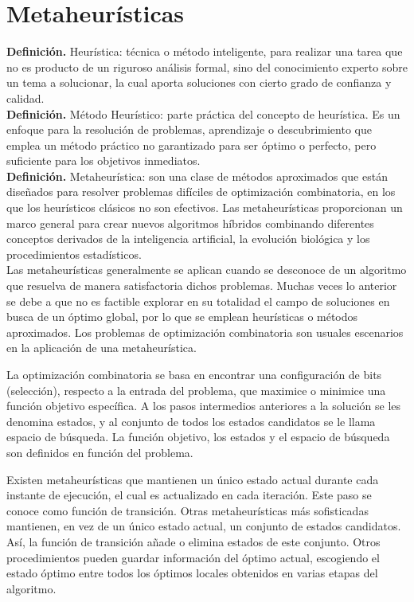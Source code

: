 \documentclass[a4paper,12pt]{book}
\begin{document}
	\section{Metaheurísticas}
	
	\textbf{Definición.} Heurística: técnica o método inteligente, para realizar una tarea que no es producto de un riguroso análisis formal, sino del conocimiento experto sobre un tema a solucionar, la cual aporta soluciones con cierto grado de confianza y calidad. \\
	
	\textbf{Definición.} Método Heurístico: parte práctica del concepto de heurística. Es un enfoque para la resolución de problemas, aprendizaje o descubrimiento que emplea un método práctico no garantizado para ser óptimo o perfecto, pero suficiente para los objetivos inmediatos. \\
	
	\textbf{Definición.} Metaheurística: son una clase de métodos aproximados que están diseñados para resolver problemas difíciles de optimización combinatoria, en los que los heurísticos clásicos no son efectivos. Las metaheurísticas proporcionan un marco general para crear nuevos algoritmos híbridos combinando diferentes conceptos derivados de la inteligencia artificial, la evolución biológica y los procedimientos estadísticos. \\
	
	Las metaheurísticas generalmente se aplican cuando se desconoce de un algoritmo que resuelva de manera satisfactoria dichos problemas. Muchas veces lo anterior se debe a que no es factible explorar en su totalidad el campo de soluciones en busca de un óptimo global, por lo que se emplean heurísticas o métodos aproximados. Los problemas de optimización combinatoria son usuales escenarios en la aplicación de una metaheurística.
	
	La optimización combinatoria se basa en encontrar una configuración de bits (selección), respecto a la entrada del problema, que maximice o minimice una función objetivo específica. A los pasos intermedios anteriores a la solución se les denomina estados, y al conjunto de todos los estados candidatos se le llama espacio de búsqueda. La función objetivo, los estados y el espacio de búsqueda son definidos en función del problema.
	
	Existen metaheurísticas que mantienen un único estado actual durante cada instante de ejecución, el cual es actualizado en cada iteración. Este paso se conoce como función de transición. Otras metaheurísticas más sofisticadas mantienen, en vez de un único estado actual, un conjunto de estados candidatos. Así, la función de transición añade o elimina estados de este conjunto. Otros procedimientos pueden guardar información del óptimo actual, escogiendo el estado óptimo entre todos los óptimos locales obtenidos en varias etapas del algoritmo.
	
\end{document}
